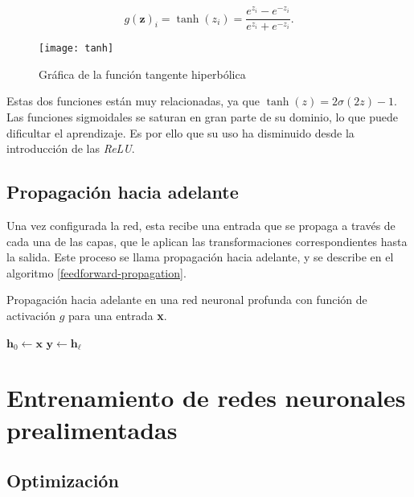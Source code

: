 $$g(\textbf{z})_i = \tanh(z_i) = \frac{e^{z_i} - e^{-z_i}}{e^{z_i}+e^{-z_i}}.$$

\begin{figure}[htpb]
  \centering
  \texttt{[image: tanh]}
  \caption{Gráfica de la función tangente hiperbólica}
  \label{fig:tanh}
\end{figure}

Estas dos funciones están muy relacionadas, ya que $\tanh (z) = 2 \sigma (2z) - 1$. Las funciones sigmoidales se saturan en gran parte de su dominio, lo que puede dificultar el aprendizaje. Es por ello que su uso ha disminuido desde la introducción de las \textit{ReLU}.

\subsection{Propagación hacia adelante}

Una vez configurada la red, esta recibe una entrada que se propaga a través de cada una de las capas, que le aplican las transformaciones correspondientes hasta la salida. Este proceso se llama propagación hacia adelante, y se describe en el algoritmo \ref{feedforward-propagation}.


\begin{algorithm}
\label{feedforward-propagation}
 \caption{Propagación hacia adelante en una red neuronal profunda con función de activación $g$ para una entrada \textbf{x}.}
     \SetAlgoLined
     $\textbf{h}_0 \leftarrow \textbf{x}$\;
     $\textbf{y} \leftarrow \textbf{h}_{\ell}$\;
\end{algorithm}


\section{Entrenamiento de redes neuronales prealimentadas}

\subsection{Optimización}\label{optimizacion}

